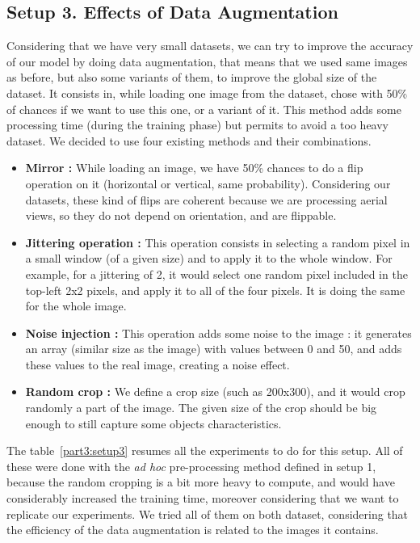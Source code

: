 \subsection*{Setup 3. Effects of Data Augmentation}
Considering that we have very small datasets, we can try to improve the accuracy of our model by doing data augmentation, that means that we used same images as before, but also some variants of them, to improve the global size of the dataset. It consists in, while loading one image from the dataset, chose with 50\% of chances if we want to use this one, or a variant of it. This method adds some processing time (during the training phase) but permits to avoid a too heavy dataset. We decided to use four existing methods and their combinations.
\begin{itemize}
\item \textbf{Mirror :} While loading an image, we have 50\% chances to do a flip operation on it (horizontal or vertical, same probability). Considering our datasets, these kind of flips are coherent because we are processing aerial views, so they do not depend on orientation, and are flippable.
\item \textbf{Jittering operation :} This operation consists in selecting a random pixel in a small window (of a given size) and to apply it to the whole window. For example, for a jittering of 2, it would select one random pixel included in the top-left 2x2 pixels, and apply it to all of the four pixels. It is doing the same for the whole image.
\item \textbf{Noise injection :} This operation adds some noise to the image : it generates an array (similar size as the image) with values between 0 and 50, and adds these values to the real image, creating a noise effect.
\item \textbf{Random crop :} We define a crop size (such as 200x300), and it would crop randomly a part of the image. The given size of the crop should be big enough to still capture some objects characteristics.
\end{itemize}
The table~\ref{part3:setup3} resumes all the experiments to do for this setup. All of these were done with the \textit{ad hoc} pre-processing method defined in setup 1, because the random cropping is a bit more heavy to compute, and would have considerably increased the training time, moreover considering that we want to replicate our experiments. We tried all of them on both dataset, considering that the efficiency of the data augmentation is related to the images it contains.

